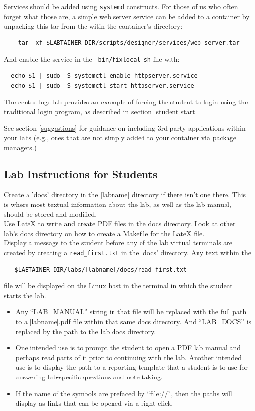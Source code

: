 \documentclass[12pt]{article}
\begin{document}
Services should be added using {\tt systemd} constructs.  For those of us who often forget what those are, a simple web server
service can be added to a container by unpacking this tar from the witin the container's directory:
\begin{verbatim}
    tar -xf $LABTAINER_DIR/scripts/designer/services/web-server.tar
\end{verbatim} 
\noindent And enable the service in the {\tt \_bin/fixlocal.sh} file with:
\begin{verbatim}
  echo $1 | sudo -S systemctl enable httpserver.service
  echo $1 | sudo -S systemctl start httpserver.service
\end{verbatim}


The centos-logs lab provides an example of forcing the student to login using the traditional
login program, as described in section \ref{student start}.

See section \ref{suggestions} for guidance on including 3rd party applications within your labs (e.g., ones that are
not simply added to your container via package managers.)


\subsection {Lab Instructions for Students} \label{instructions}
Create a 'docs' directory in the [labname] directory if there isn't one there. This is where most textual information about the lab, as well as the lab manual, should be stored and modified. \\ 

\noindent Use LateX to write and create PDF files in the docs directory. Look at other lab's docs directory on how to create a Makefile for the LateX file. \\ 

\noindent Display a message to the student before any 
of the lab virtual terminals are created by creating a {\tt read\_first.txt} in the 'docs' directory. Any text within the 
\begin{verbatim}
   $LABTAINER_DIR/labs/[labname]/docs/read_first.txt
\end{verbatim}
\noindent file will be displayed on the Linux host in the terminal in which the student
starts the lab.  
\begin{itemize}
	\item Any ``LAB\_MANUAL'' string in that file will be replaced with the full path
to a [labname].pdf file within that same docs directory. And ``LAB\_DOCS'' is replaced by the path to the lab docs directory.  
	\item One intended use is to prompt the student to open a PDF lab manual and perhaps read parts of it prior to continuing with the lab. Another intended use is to display the path to a reporting template that a student is to use for answering lab-specific questions and note taking. 
	\item If the name of the symbols are prefaced by ``file://'', then the paths will display as links that can be opened via a right click.
\end{itemize}
	
\end{document}
